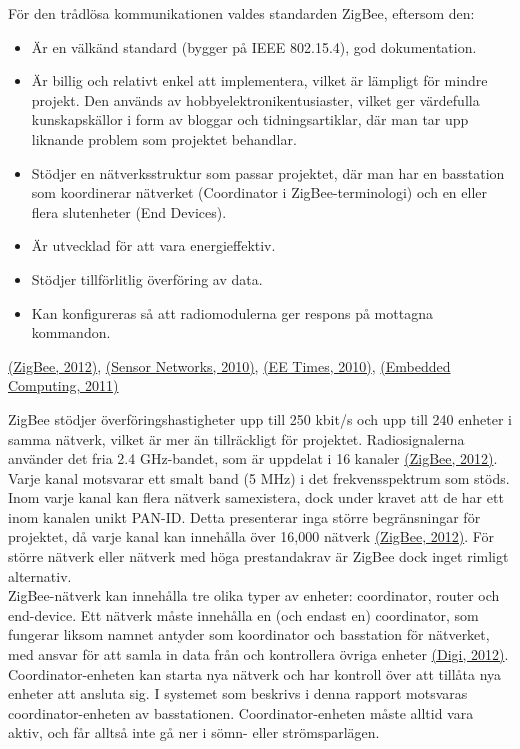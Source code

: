 \documentclass[a4paper,11pt]{article}
\begin{document}
För den trådlösa kommunikationen valdes standarden ZigBee, eftersom den:
	
	\begin{itemize}
    	\item Är en välkänd standard (bygger på IEEE 802.15.4), god dokumentation.
    	\item Är billig och relativt enkel att implementera, vilket är lämpligt för mindre projekt. Den används av hobbyelektronikentusiaster, vilket ger värdefulla kunskapskällor i form av bloggar och tidningsartiklar, där man tar upp liknande problem som projektet behandlar.
    	\item Stödjer en nätverksstruktur som passar projektet, där man har en basstation som koordinerar nätverket (Coordinator i ZigBee-terminologi) och en eller flera slutenheter (End Devices).
    	\item Är utvecklad för att vara energieffektiv.
    	\item Stödjer tillförlitlig överföring av data.
    	\item Kan konfigureras så att radiomodulerna ger respons på mottagna kommandon.
    	\end{itemize}
\hyperref[zigbee]{(ZigBee, 2012)}, \hyperref[sensornetworks]{(Sensor Networks, 2010)}, \hyperref[eetimes]{(EE Times, 2010)}, \hyperref[embedded]{(Embedded Computing, 2011)}
    	
ZigBee stödjer överföringshastigheter upp till 250 kbit/s och upp till 240 enheter i samma nätverk, vilket är mer än tillräckligt för projektet. Radiosignalerna använder det fria 2.4 GHz-bandet, som är uppdelat i 16 kanaler \hyperref[zigbee]{(ZigBee, 2012)}. Varje kanal motsvarar ett smalt band (5 MHz) i det frekvensspektrum som stöds. Inom varje kanal kan flera nätverk samexistera, dock under kravet att de har ett inom kanalen unikt PAN-ID. Detta presenterar inga större begränsningar för projektet, då varje kanal kan innehålla över 16,000 nätverk \hyperref[zigbee]{(ZigBee, 2012)}. För större nätverk eller nätverk med höga prestandakrav är ZigBee dock inget rimligt alternativ. \\

ZigBee-nätverk kan innehålla tre olika typer av enheter: coordinator, router och end-device. Ett nätverk måste innehålla en (och endast en) coordinator, som fungerar liksom namnet antyder som koordinator och basstation för nätverket, med ansvar för att samla in data från och kontrollera övriga enheter \hyperref[digi]{(Digi, 2012)}. Coordinator-enheten kan starta nya nätverk och har kontroll över att tillåta nya enheter att ansluta sig. I systemet som beskrivs i denna rapport motsvaras coordinator-enheten av basstationen. Coordinator-enheten måste alltid vara aktiv, och får alltså inte gå ner i sömn- eller strömsparlägen. \\
\end{document}
